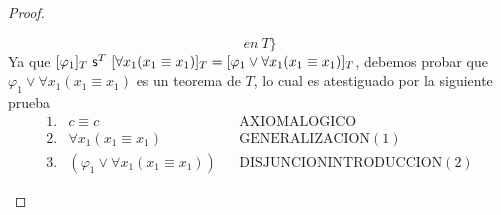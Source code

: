 \begin{proof}
\begin{enumerate}[(1)]
\[{          en} \ T\}
        \]
       \PN Ya que $[\varphi_{1}]_{T} \ \mathsf{s}^{T} \ [\forall x_{1} (x_{1} \equiv x_{1})]_{T} = [\varphi_{1} \vee \forall
       x_{1}(x_{1}\equiv x_{1})]_{T}$, debemos probar que $\varphi_{1} \vee \forall x_{1} (x_{1} \equiv x_{1})$ es un
       teorema de $T$, lo cual es atestiguado por la siguiente prueba
        \[
          \begin{array}{llll}
            1. & c \equiv c && \text{AXIOMALOGICO} \\
            2. & \forall x_{1} (x_{1} \equiv x_{1}) && \text{GENERALIZACION}(1) \\
            3. & (\varphi_{1} \vee \forall x_{1} (x_{1}\equiv x_{1})) && \text{DISJUNCIONINTRODUCCION}(2)
          \end{array}
        \]


\end{enumerate}
\end{proof}
